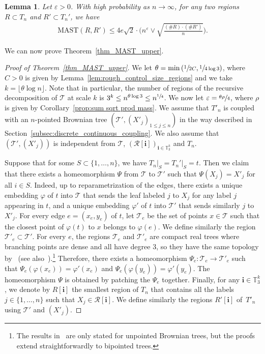 \documentclass[JEP,XML,SOM,Unicode,NoFloatCountersInSection,published]{cedram}
\newcommand{\Tt}{\mathcal{T}}
\newcommand{\Rr}{\mathcal{R}}
\newcommand{\ii}{\mathbf{i}}
\let\eps\varepsilon
\theoremstyle{plain}
\newtheorem{lemma}[theorem]{Lemma}
\theoremstyle{definition}
\begin{document}
\begin{lemma}\label{lem:bound mast of two regions}
Let $\eps>0$. With high probability as $n\rightarrow \infty$, for any two regions $R\subset T_n$ and $R'\subset T_n'$, we have\vspace*{-3pt}
\begin{align}\label{eqn_general_sqrt_bound}
\mathrm{MAST}(R,R') \leq 4e\sqrt{2} \cdot \biggl( n^\eps \vee \sqrt{\frac{(\#R)\cdot (\#R')}{n}} \biggr).
\end{align}
\end{lemma}

We can now prove Theorem~\ref{thm_MAST_upper}.
\begin{proof}[Proof of Theorem~\ref{thm_MAST_upper}]
We let $\theta= \min \left( \sfrac{1}{2C}, \sfrac{1}{4 \log 3} \right)$, where $C>0$ is given by Lemma~\ref{lem:rough_control_size_regions} and we take $k=\lfloor \theta \log n \rfloor$. Note that in particular, the number of regions of the recursive decomposition of $\Tt$ at scale $k$ is $3^k\leq n^{\theta \log 3} \leq n^{\sfrac{1}{4}}$.
We now let $\eps =\sfrac{\theta \rho}{4}$, where $\rho$ is given by Corollary~\ref{prop:sum sqrt prod mass}. We assume that $T'_n$ is coupled with an $n$-pointed Brownian tree $\left( \Tt', (X'_j)_{1 \leq j \leq n} \right)$ in the way described in Section~\ref{subsec:discrete_continuous_coupling}.
We also assume that $\left(\Tt', (X'_j) \right)$ is independent from $\Tt$, $\left( \Rr[\ii] \right)_{\ii \in \mathbb{T}_3^k}$ and $T_n$.

Suppose that for some $S\subset \{1,\dots, n\}$, we have $T_n\vert_S=T_n'\vert_S=t$. Then we claim that there exists a homeomorphism $\Psi$ from $\Tt$ to $\Tt'$ such that $\Psi(X_j)=X'_j$ for all $i \in S$.
Indeed, up to reparametrization of the edges, there exists a unique embedding $\varphi$ of $t$ into $\Tt$ that sends the leaf labeled $j$ to $X_j$ for any label $j$ appearing in $t$, and a unique embedding $\varphi'$ of $t$ into $\Tt'$ that sends similarly $j$ to $X'_j$. For every edge $e=(x_e,y_e)$ of $t$, let $\mathcal{T}_e$ be the set of points $x \in \mathcal{T}$ such that the closest point of $\varphi(t)$ to $x$ belongs to $\varphi(e)$.
We define similarly the region $\mathcal{T}'_e \subset \Tt'$.
For every $e$, the regions $\mathcal{T}_e$ and $\mathcal{T}'_e$ are compact real trees where branching points are dense and all have degree $3$, so they have the same topology by~\cite[Th.\,1]{BT21} (see also~\cite{CH08}).\footnote{The results in~\cite{BT21} are only stated for unpointed Brownian trees, but the proofs extend straightforwardly to bipointed trees.}
Therefore, there exists a homeomorphism $\Psi_e : \mathcal{T}_e \to \mathcal{T}'_e$ such that $\Psi_e \left( \varphi(x_e) \right)=\varphi'(x_e)$ and $\Psi_e \left( \varphi(y_e) \right)=\varphi'(y_e)$.
The homeomorphism $\Psi$ is obtained by patching the $\Psi_e$ together.
Finally, for any $\ii \in \mathbb{T}_3^k$, we denote by $R[\ii]$ the smallest region of $T_n$ that contains all the labels $j \in \{1,\dots,n\}$ such that $X_j \in \Rr[\ii]$.
We define similarly the regions $R'[\ii]$ of~$T'_n$ using $\Tt'$ and $(X'_j)$.


\end{proof}
\end{document}
